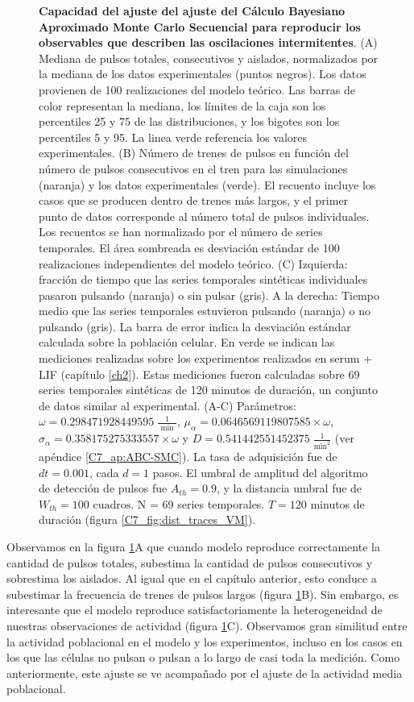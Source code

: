 \documentclass[./main.tex]{subfiles}
\begin{document}
\begin{figure}
    \caption{\textbf{Capacidad del ajuste del ajuste del Cálculo Bayesiano Aproximado Monte Carlo Secuencial para reproducir los observables que describen las oscilaciones intermitentes}. (A)  Mediana de pulsos totales, consecutivos y aislados, normalizados por la mediana de los datos experimentales (puntos negros). Los datos provienen de 100 realizaciones del modelo teórico. Las barras de color representan la mediana, los límites de la caja son los percentiles 25 y 75 de las distribuciones, y los bigotes son los percentiles 5 y 95. La linea verde referencia los valores experimentales. (B) Número de trenes de pulsos en función del número de pulsos consecutivos en el tren para las simulaciones (naranja) y los datos experimentales (verde). El recuento incluye los casos que se producen dentro de trenes más largos, y el primer punto de datos corresponde al número total de pulsos individuales. Los recuentos se han normalizado por el número de series temporales. El área sombreada es desviación estándar de 100 realizaciones independientes del modelo teórico. (C) Izquierda: fracción de tiempo que las series temporales sintéticas individuales pasaron pulsando (naranja) o sin pulsar (gris). A la derecha: Tiempo medio que las series temporales estuvieron pulsando (naranja) o no pulsando (gris). La barra de error indica la desviación estándar calculada sobre la población celular. En verde se indican las mediciones realizadas sobre los experimentos realizados en serum + LIF (capítulo \ref{ch2}). Estas mediciones fueron calculadas sobre 69 series temporales sintéticas de 120 minutos de duración, un conjunto de datos similar al experimental. (A-C) Parámetros:  $\omega = 0.298471928449595 \; \frac{1}{\text{ min }}$, $\mu_{\alpha} = 0.0646569119807585 \times \omega$, $ \sigma_{\alpha} = 0.358175275333557  \times \omega$ y $D = 0.541442551452375 \; \frac{1}{\text{min}^{2}}$ (ver apéndice \ref{C7_ap:ABC-SMC}). La tasa de adquisición fue de $dt = 0.001$, cada $d = 1$ pasos. El umbral de amplitud del algoritmo de detección de pulsos fue $A_{th} = 0.9$, y la distancia umbral fue de $W_{th} = 100\text{ cuadros}$. N = $69$ series temporales. $T = 120$ minutos de duración (figura \ref{C7_fig:dist_traces_VM}).}
    \label{C7_fig:dist_param_evaluation}
\end{figure} 

Observamos en la figura \ref{C7_fig:dist_param_evaluation}A que cuando modelo reproduce correctamente la cantidad de pulsos totales, subestima la cantidad de pulsos consecutivos y sobrestima los aislados. Al igual que en el capítulo anterior, esto conduce a subestimar la frecuencia de trenes de pulsos largos (figura \ref{C7_fig:dist_param_evaluation}B). Sin embargo, es interesante que el modelo reproduce satisfactoriamente la heterogeneidad de nuestras observaciones de actividad (figura \ref{C7_fig:dist_param_evaluation}C). Observamos gran similitud entre la actividad poblacional en el modelo y los experimentos, incluso en los casos en los que las células no pulsan o pulsan a lo largo de casi toda la medición. Como anteriormente, este ajuste se ve acompañado por el ajuste de la actividad media poblacional.
\end{document}
